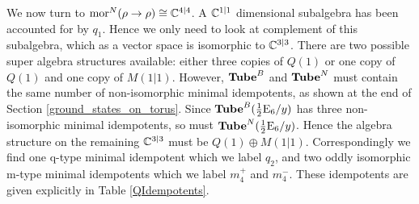 We now turn to $\text{mor}^N(\rho \to \rho) \cong \mathbb{C}^{4|4}$. 
A $\mathbb{C}^{1|1}$ dimensional subalgebra has been accounted for by $q_1$. 
Hence we only need to look at complement of this subalgebra, which as a vector space is isomorphic to $\mathbb{C}^{3|3}$.
There are two possible super algebra structures available: either three copies of $Q(1)$ or one copy of $Q(1)$ and one copy of $M(1|1)$.
However, $\textbf{Tube}^B$ and $\textbf{Tube}^N$ must contain the same number of non-isomorphic minimal idempotents, 
as shown at the end of Section \ref{ground_states_on_torus}. 
Since $\textbf{Tube}^B(\frac{1}{2}\text{E}_6/y)$ has three non-isomorphic minimal idempotents, 
so must $\textbf{Tube}^N(\frac{1}{2}\text{E}_6/y)$. 
Hence the algebra structure on the remaining $\mathbb{C}^{3|3}$ must be $Q(1)\oplus M(1|1)$.
Correspondingly we find one q-type minimal idempotent which we label $q_2$, 
and two oddly isomorphic m-type minimal idempotents which we label $m_4^+$ and $m_4^-$.
These idempotents are given explicitly in Table \ref{QIdempotents}.



